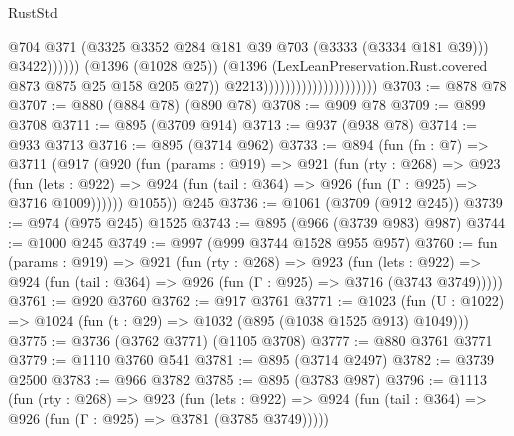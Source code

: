 \begin{lexlean}{RustStd}
\begin{coremodule}
{\begin{coremodule}
{{{{{{{{{                                                          @704
                                                          @371
                                                          (@3325
                                                            @3352
                                                            @284
                                                            @181
                                                            @39
                                                            @703
                                                            (@3333 (@3334 @181 @39)))
                                                          @3422))))))
                                              (@1396 (@1028 @25))
                                              (@1396
                                                (LexLeanPreservation.Rust.covered
                                                  @873
                                                  @875
                                                  @25
                                                  @158
                                                  @205
                                                  @27))
                                              @2213)))))))))))))))))))))
@3703 := @878 @78
@3707 := @880 (@884 @78) (@890 @78)
@3708 := @909 @78
@3709 := @899 @3708
@3711 := @895 (@3709 @914)
@3713 := @937 (@938 @78)
@3714 := @933 @3713
@3716 := @895 (@3714 @962)
@3733 := @894
    (fun (fn : @7) =>
    @3711
      (@917
        (@920
          (fun (params : @919) =>
          @921
            (fun (rty : @268) =>
            @923
              (fun (lets : @922) =>
              @924 (fun (tail : @364) => @926 (fun (Γ : @925) => @3716 @1009))))))
        @1055))
    @245
@3736 := @1061 (@3709 (@912 @245))
@3739 := @974 (@975 @245) @1525
@3743 := @895 (@966 (@3739 @983) @987)
@3744 := @1000 @245
@3749 := @997 (@999 @3744 @1528 @955 @957)
@3760 := fun (params : @919) =>
  @921
    (fun (rty : @268) =>
    @923
      (fun (lets : @922) =>
      @924 (fun (tail : @364) => @926 (fun (Γ : @925) => @3716 (@3743 @3749)))))
@3761 := @920 @3760
@3762 := @917 @3761
@3771 := @1023 (fun (U : @1022) => @1024 (fun (t : @29) => @1032 (@895 (@1038 @1525 @913) @1049)))
@3775 := @3736 (@3762 @3771) (@1105 @3708)
@3777 := @880 @3761 @3771
@3779 := @1110 @3760 @541
@3781 := @895 (@3714 @2497)
@3782 := @3739 @2500
@3783 := @966 @3782
@3785 := @895 (@3783 @987)
@3796 := @1113
    (fun (rty : @268) =>
    @923
      (fun (lets : @922) =>
      @924 (fun (tail : @364) => @926 (fun (Γ : @925) => @3781 (@3785 @3749)))))
}}}}}}}}}
\end{coremodule}}
\end{coremodule}
\end{lexlean}
